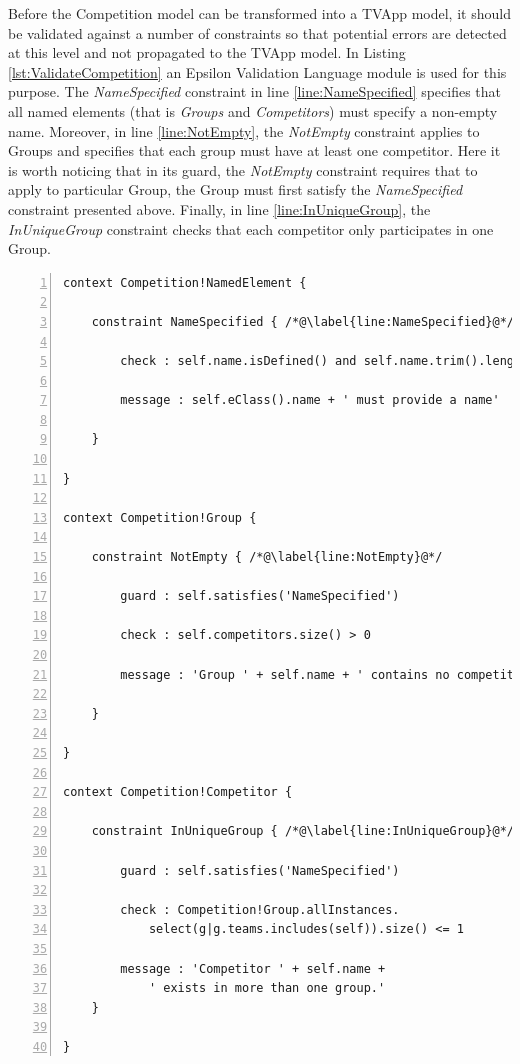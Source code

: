 Before the Competition model can be transformed into a TVApp model, it should be validated against a number of constraints so that potential errors are detected at this level and not propagated to the TVApp model. In Listing \ref{lst:ValidateCompetition} an Epsilon Validation Language module is used for this purpose. The \emph{NameSpecified} constraint in line \ref{line:NameSpecified} specifies that all named elements (that is \emph{Groups} and \emph{Competitors}) must specify a non-empty name. Moreover, in line \ref{line:NotEmpty}, the \emph{NotEmpty} constraint applies to Groups and specifies that each group must have at least one competitor. Here it is worth noticing that in its guard, the \emph{NotEmpty} constraint requires that to apply to particular Group, the Group must first satisfy the \emph{NameSpecified} constraint presented above. Finally, in line \ref{line:InUniqueGroup}, the \emph{InUniqueGroup} constraint checks that each competitor only participates in one Group.

\begin{lstlisting}[basicstyle=\ttfamily\footnotesize, flexiblecolumns=true, numbers=left, nolol=true, caption=EVL module that validates a Competition model, label=lst:ValidateCompetition, language=EVL, tabsize=2]
context Competition!NamedElement {
	
	constraint NameSpecified { /*@\label{line:NameSpecified}@*/
		
		check : self.name.isDefined() and self.name.trim().length > 0
		
		message : self.eClass().name + ' must provide a name'
		
	}
	
}

context Competition!Group {
	
	constraint NotEmpty { /*@\label{line:NotEmpty}@*/
		
		guard : self.satisfies('NameSpecified')
		
		check : self.competitors.size() > 0
		
		message : 'Group ' + self.name + ' contains no competitors'
		
	}
	
}

context Competition!Competitor {
	
	constraint InUniqueGroup { /*@\label{line:InUniqueGroup}@*/
		
		guard : self.satisfies('NameSpecified')
		
		check : Competition!Group.allInstances.
			select(g|g.teams.includes(self)).size() <= 1
		
		message : 'Competitor ' + self.name + 
			' exists in more than one group.'
	}
	
}
\end{lstlisting}

